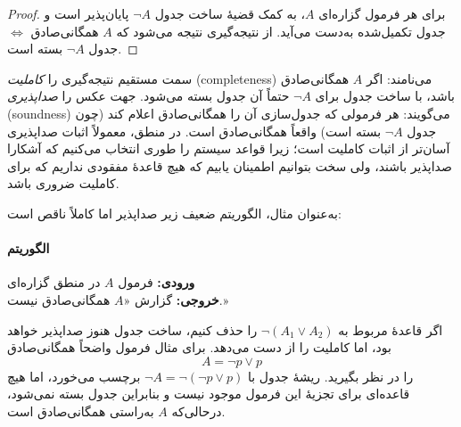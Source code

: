     \begin{proof}
      برای هر فرمول گزاره‌ای $A$، به کمک قضیهٔ  ساخت جدول $\neg A$ پایان‌پذیر است و جدول تکمیل‌شده به‌دست می‌آید. از نتیجه‌گیری  نتیجه می‌شود که  
      $A$ همگانی‌صادق $\iff$ جدول $\neg A$ بسته است.
    \end{proof}
    
    سمت مستقیم نتیجه‌گیری  را \emph{کاملیت} (completeness) می‌نامند: اگر $A$ همگانی‌صادق باشد، با ساخت جدول برای $\neg A$ حتماً آن جدول بسته می‌شود.  
    جهت عکس را \emph{صداپذیری} (soundness) می‌گویند: هر فرمولی که جدول‌سازی آن را همگانی‌صادق اعلام کند (چون جدول $\neg A$ بسته است) واقعاً همگانی‌صادق است. در منطق، معمولاً اثبات صداپذیری آسان‌تر از اثبات کاملیت است؛ زیرا قواعد سیستم را طوری انتخاب می‌کنیم که آشکارا صداپذیر باشند، ولی سخت بتوانیم اطمینان یابیم که هیچ قاعدهٔ مفقودی نداریم که برای کاملیت ضروری باشد.
    
    به‌عنوان مثال، الگوریتم ضعیف زیر صداپذیر اما کاملاً ناقص است:
    
    \paragraph{الگوریتم   \\}  
    \textbf{ورودی:} فرمول $A$ در منطق گزاره‌ای \\
    \textbf{خروجی:} گزارش «$A$ همگانی‌صادق نیست.»
    
    \begin{example}[مثال \lr{2.72}]
    اگر قاعدهٔ مربوط به $\neg(A_1 \lor A_2)$ را حذف کنیم، ساخت جدول هنوز صداپذیر خواهد بود، اما کاملیت را از دست می‌دهد. برای مثال فرمول واضحاً همگانی‌صادق
    \[
    A = \neg p \lor p
    \]
    را در نظر بگیرید. ریشهٔ جدول با $\neg A = \neg(\neg p \lor p)$ برچسب می‌خورد، اما هیچ قاعده‌ای برای تجزیهٔ این فرمول موجود نیست و بنابراین جدول بسته نمی‌شود، درحالی‌که $A$ به‌راستی همگانی‌صادق است.
    \end{example}


